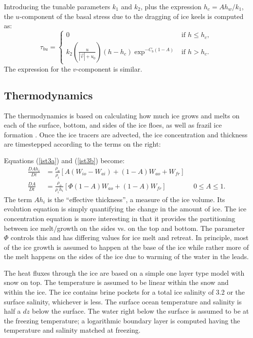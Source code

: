 Introducing the tunable parameters $k_1$ and $k_2$, plus the
expression $h_c = A h_w/k_1$, the $u$-component of the basal
stress due to the dragging of ice keels is computed as:
\begin{equation}
  \tau_{bu} = 
    \begin{cases}
      0& \text{if $h \leq h_c$},\\
      k_2 \left( \frac{u}{|\vec{v}| + u_0} \right)
            (h-h_c)\exp^{-C_b(1-A)}& \text{if $h > h_c$}.
    \end{cases}
\end{equation}
The expression for the $v$-component is similar.

\subsection{Thermodynamics}
\label{Growth}

The thermodynamics is based on calculating how much ice grows and
melts on each of the surface, bottom, and sides of the ice floes,
as well as frazil ice formation \citep{Mellor89}.
Once the ice tracers are advected, the ice concentration and
thickness are timestepped according to the terms on the right:

Equations (\ref{ist3a}) and (\ref{ist3b}) become:
\begin{align}
  \frac{D A h_i }{D t}
  & = \frac{\rho_o }{ \rho_i} \left[ A (W_{io} - W_{ai}) + (1-A) W_{ao}
  + W_{fr} \right]
\label{ist4a} \\
  \frac{D A }{ D t}
  & = \frac{\rho_o}{ \rho_i h_i} \left[ \Phi (1-A) W_{ao} + (1-A)
  W_{fr} \right] \qquad \qquad 0 \leq A \leq 1 .
\label{ist4b}
\end{align}
The term $Ah_i$ is the ``effective thickness'', a measure of the ice
volume. Its evolution equation is simply quantifying the change in
the amount of ice. The ice concentration equation is more interesting in
that it provides the partitioning between ice melt/growth on the sides
vs. on the top and bottom. The parameter $\Phi$ controls this and has
differing values for ice melt and retreat. In principle, most of the ice
growth is assumed to happen at the base of the ice while rather more of
the melt happens on the sides of the ice due to warming of the water in
the leads.

The heat fluxes through the ice are based on a simple one layer
\citet{Semtner76a} type model with snow on top. The temperature is
assumed to be linear within the snow and within the ice. The ice contains
brine pockets for a total ice salinity of 3.2 or the surface salinity,
whichever is less. The surface ocean temperature and salinity is half a
$dz$ below the surface. The water right below the surface is assumed to
be at the freezing temperature; a logarithmic boundary layer is computed
having the temperature and salinity matched at freezing.


